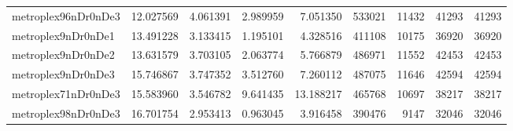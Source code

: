 \documentclass[../../../thesis.tex]{subfiles}
\begin{document}
\begin{longtable}{|l|r|r|r|r|r|r|r|r|}
metroplex96nDr0nDe3 & 12.027569 & 4.061391 & 2.989959 & 7.051350 & 533021 & 11432 & 41293 & 41293 \\
metroplex9nDr0nDe1 & 13.491228 & 3.133415 & 1.195101 & 4.328516 & 411108 & 10175 & 36920 & 36920 \\
metroplex9nDr0nDe2 & 13.631579 & 3.703105 & 2.063774 & 5.766879 & 486971 & 11552 & 42453 & 42453 \\
metroplex9nDr0nDe3 & 15.746867 & 3.747352 & 3.512760 & 7.260112 & 487075 & 11646 & 42594 & 42594 \\
metroplex71nDr0nDe3 & 15.583960 & 3.546782 & 9.641435 & 13.188217 & 465768 & 10697 & 38217 & 38217 \\
metroplex98nDr0nDe3 & 16.701754 & 2.953413 & 0.963045 & 3.916458 & 390476 & 9147 & 32046 & 32046 \\
\end{longtable}
\end{document}
